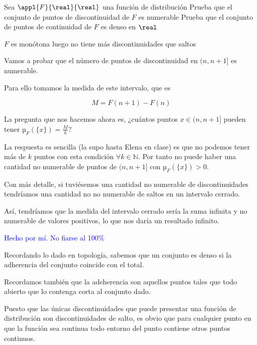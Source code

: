 \begin{problem}
Sea $\appl{F}{\real}{\real}$ una función de distribución
\ppart Prueba que el conjunto de puntos de discontinuidad de $F$ es numerable
\ppart Prueba que el conjunto de puntos de continuidad de $F$ es denso en $\real$

\obs $F$ es monótona luego no tiene más discontinuidades que saltos
\solution

\spart Vamos a probar que el número de puntos de discontinuidad en $(n, n+1]$ es numerable.

Para ello tomamos la medida de este intervalo, que es

\[ M = F(n+1)-F(n)\]

La pregunta que nos hacemos ahora es, ¿cuántos puntos $x \in (n, n+1]$ pueden tener $µ_F(\{x\}) = \frac{M}{k}$?

La respuesta es sencilla (la supo hasta Elena en clase) es que no podemos tener más de $k$ puntos con esta condición $∀k ∈ ℕ$. Por tanto no puede haber una cantidad no numerable de puntos de $(n, n+1]$ con $µ_F(\{x\})>0$.

Con más detalle, si tuviésemos una cantidad no numerable de discontinuidades tendríamos una cantidad no no numerable de saltos en un intervalo cerrado.

Así, tendríamos que la medida del intervalo cerrado sería la suma infinita y no numerable de valores positivos, lo que nos daría un resultado infinito.


\spart \textcolor{blue}{Hecho por mí. No fiarse al 100\%}

Recordando lo dado en topología, sabemos que un conjunto es denso si la adherencia del conjunto coincide con el total.

Recordamos también que la adeherencia son aquellos puntos tales que todo abierto que lo contenga corta al conjunto dado.

Puesto que las únicas discontinuidades que puede presentar una función de distribución son discontinuidades de salto, es obvio que para cualquier punto en que la función sea continua todo entorno del punto contiene otros puntos continuos.

\end{problem}

